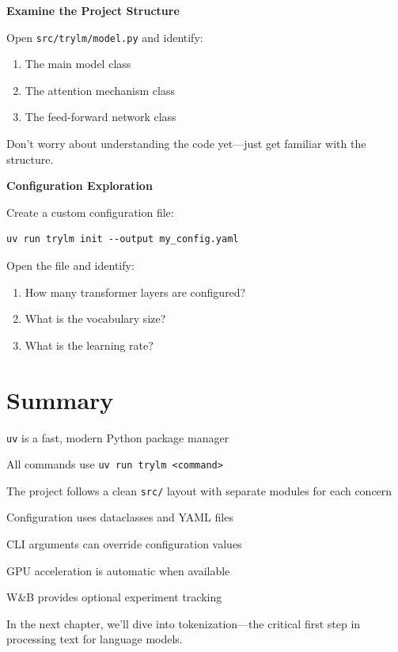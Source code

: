 \begin{exercise}
\textbf{Examine the Project Structure}

Open \texttt{src/trylm/model.py} and identify:
\begin{enumerate}
    \item The main model class
    \item The attention mechanism class
    \item The feed-forward network class
\end{enumerate}
Don't worry about understanding the code yet---just get familiar with the structure.
\end{exercise}

\begin{exercise}
\textbf{Configuration Exploration}

Create a custom configuration file:
\begin{lstlisting}[style=shell, numbers=none]
uv run trylm init --output my_config.yaml
\end{lstlisting}
Open the file and identify:
\begin{enumerate}
    \item How many transformer layers are configured?
    \item What is the vocabulary size?
    \item What is the learning rate?
\end{enumerate}
\end{exercise}

\section{Summary}

\begin{summary}
    \item \texttt{uv} is a fast, modern Python package manager
    \item All commands use \texttt{uv run trylm <command>}
    \item The project follows a clean \texttt{src/} layout with separate modules for each concern
    \item Configuration uses dataclasses and YAML files
    \item CLI arguments can override configuration values
    \item GPU acceleration is automatic when available
    \item W\&B provides optional experiment tracking
\end{summary}

In the next chapter, we'll dive into tokenization---the critical first step in processing text for language models.
